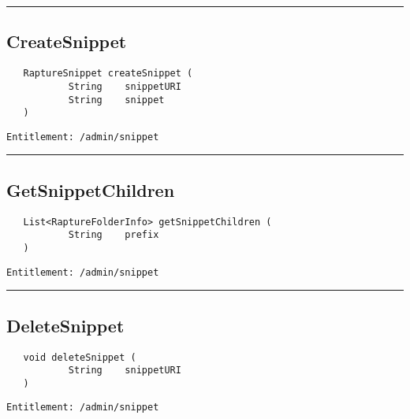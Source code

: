 \rule{12cm}{2pt}
\subsection{CreateSnippet}
\label{Api:CreateSnippet}
\begin{verbatim}
   RaptureSnippet createSnippet (
           String    snippetURI
           String    snippet
   )
\end{verbatim}
\begin{Verbatim}[fontsize=\small, formatcom=\color{Maroon}]
  Entitlement: /admin/snippet
\end{Verbatim}



\rule{12cm}{2pt}
\subsection{GetSnippetChildren}
\label{Api:GetSnippetChildren}
\begin{verbatim}
   List<RaptureFolderInfo> getSnippetChildren (
           String    prefix
   )
\end{verbatim}
\begin{Verbatim}[fontsize=\small, formatcom=\color{Maroon}]
  Entitlement: /admin/snippet
\end{Verbatim}



\rule{12cm}{2pt}
\subsection{DeleteSnippet}
\label{Api:DeleteSnippet}
\begin{verbatim}
   void deleteSnippet (
           String    snippetURI
   )
\end{verbatim}
\begin{Verbatim}[fontsize=\small, formatcom=\color{Maroon}]
  Entitlement: /admin/snippet
\end{Verbatim}



